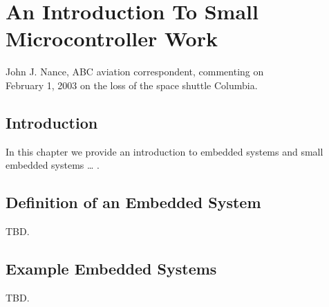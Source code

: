 \chapter[Introduction To Microcontroller Work]{An Introduction To
Small Microcontroller Work}

\label{cint0}

                   {John J. Nance, ABC aviation correspondent, 
				    commenting on \\
					February 1, 2003 on the loss of the space 
					shuttle Columbia.}

\section{Introduction}
\label{cint0:sint0}

In this chapter we provide an introduction to embedded systems and 
small embedded systems \ldots{} .

\section{Definition of an Embedded System}
\label{cint0:sdef0}

TBD.

\section{Example Embedded Systems}
\label{cint0:sexa0}

TBD.

